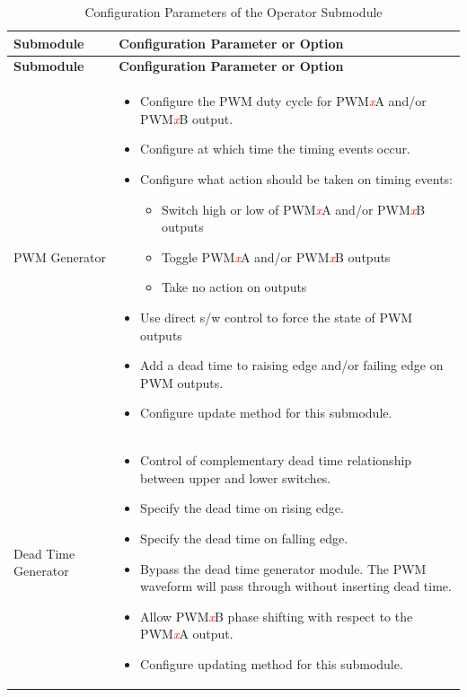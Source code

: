 \begin{longtable}[c]{|m{5cm}|m{10cm}|}
\caption{Configuration Parameters of the Operator Submodule}
\label{tab:mcpwm-param-operator}
    \\\hline
    \rowcolor{lightgray}
   \textbf{Submodule} & \textbf{Configuration Parameter or Option} \\ \hline 

\endfirsthead\hline
 \rowcolor{lightgray}
   \textbf{Submodule} & \textbf{Configuration Parameter or Option}\\
 \hline 
\endhead
\endfoot
    PWM Generator &\vspace{-1em}
    \begin{itemize}
        \item Configure the PWM duty cycle for PWM\textcolor{red}{\it{x}}A and/or PWM\textcolor{red}{\it{x}}B output.
        \item Configure at which time the timing events occur.
        \item Configure what action should be taken on timing events:
        \begin{itemize}
           \item Switch high or low of PWM\textcolor{red}{\it{x}}A and/or PWM\textcolor{red}{\it{x}}B outputs
           \item Toggle PWM\textcolor{red}{\it{x}}A and/or PWM\textcolor{red}{\it{x}}B outputs
           \item Take no action on outputs
        \end{itemize}
        \item Use direct s/w control to force the state of PWM outputs
        \item Add a dead time to raising edge and/or failing edge on PWM outputs.
        \item Configure update method for this submodule.\vspace{-1em}
    \end{itemize}\\\hline
    
    Dead Time Generator &\vspace{-1em}
    \begin{itemize}
        \item Control of complementary dead time relationship between upper and lower switches.
        \item Specify the dead time on rising edge.
        \item Specify the dead time on falling edge.
        \item Bypass the dead time generator module. The PWM waveform will pass through without inserting dead time.
        \item Allow PWM\textcolor{red}{\it{x}}B phase shifting with respect to the PWM\textcolor{red}{\it{x}}A output.
        \item Configure updating method for this submodule.\vspace{-1em}
    \end{itemize}\\\hline
    

\end{longtable}
